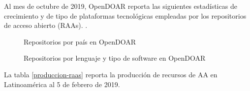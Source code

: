 Al mes de octubre de 2019, OpenDOAR reporta las siguientes estad\'isticas de crecimiento y de tipo de plataformas tecnol\'ogicas empleadas por los repositorios de acceso abierto (RAAs).
.\newline

\begin{figure}[htbp]
	\centering
    \caption{Repositorios por pa\'is en OpenDOAR} %
    \label{opendoar_estadisticas_1}
\end{figure}

\begin{figure}[htbp]
	\centering
    \caption{Repositorios por lenguaje y tipo de software en OpenDOAR} %
    \label{opendoar_estadisticas_2}
\end{figure}

La tabla \ref{produccion-raas} reporta la producci\'on de recursos de AA en Latinoam\'erica al 5 de febrero de 2019.\newline


